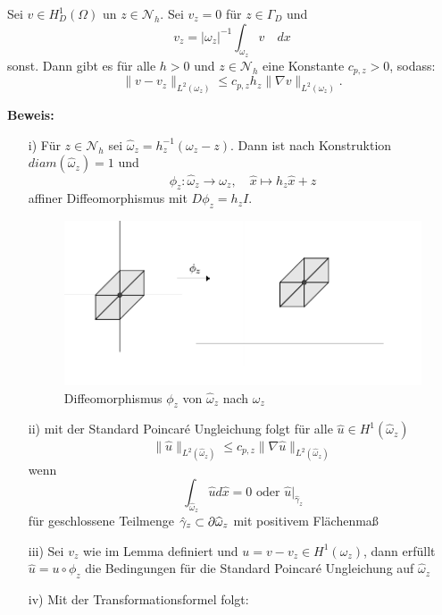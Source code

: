 \begin{lemma}
	Sei $v \in H^1_D(\Omega)$ un $z\in \mathscr{N}_h.$ Sei $v_z= 0$ für $z\in \Gamma_D$ und 
	\[ v_z = |\omega_z|^{-1} \int_{\omega_z} v \quad dx
	\]
	sonst. Dann gibt es für alle $h > 0$ und $z \in \mathscr{N}_h$ eine Konstante $c_{p,z}>0$, sodass:
	\[
	\|v-v_z\|_{L^2(\omega_z)}\leq c_{p,z}h_z\|\nabla v\|_{L^2(\omega_z)}.
	\]
\end{lemma}
\textbf{Beweis:}
\begin{itemize}
	\item[i)] 
	Für $z\in \mathscr{N}_h$ sei $\widehat{\omega}_z = h_z^{-1}(\omega_z - z)$. Dann ist nach Konstruktion $diam(\widehat{\omega}_z) = 1$ und
	\[
	\phi_z : \widehat{\omega}_z \rightarrow \omega_z, \quad \hat{x} \mapsto h_z\hat{x}+z
	\]
	affiner Diffeomorphismus mit $D\phi_z = h_zI$.
	\begin{figure}[!htbp]
		\begin{center}
			\includegraphics[width=15cm]{pics/omega.png}
		\end{center}
		\caption{Diffeomorphismus $\phi_z$ von $\widehat{\omega}_z$ nach $\omega_z$}
	\end{figure}
	\item[ii)] mit der Standard Poincaré Ungleichung folgt für alle $\widehat{u}\in H^1(\widehat{\omega}_z)$
	\[
	\|\widehat{u}\|_{L^2(\widehat{\omega}_z)} \leq c_{p,z}\|\nabla \widehat{u}\|_{L^2(\widehat{\omega}_z)}
	\]
	wenn \[ \int_{\widehat{\omega}_z}\widehat{u}d\hat{x}=0 \text{ oder }\widehat{u}|_{\hat{\gamma}_z}
	\]
	für geschlossene Teilmenge ${\hat{\gamma}_z} \subset \partial \widehat{\omega}_z$ mit positivem Flächenmaß
	\item[iii)] Sei $v_z$ wie im Lemma definiert und $u= v-v_z\in H^1(\omega_z)$, dann erfüllt $\widehat{u} = u \circ \phi_z$ die Bedingungen für die Standard Poincaré Ungleichung auf $\widehat{\omega}_z$
	\item[iv)] Mit der Transformationsformel folgt:

\end{itemize}
